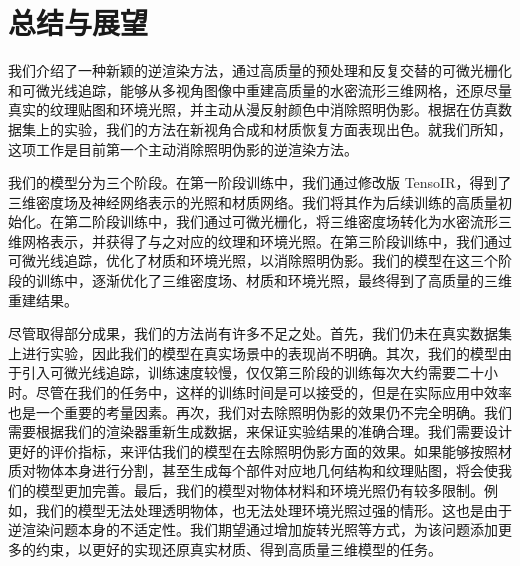 \chapter{总结与展望}

我们介绍了一种新颖的逆渲染方法，通过高质量的预处理和反复交替的可微光栅化和可微光线追踪，能够从多视角图像中重建高质量的水密流形三维网格，还原尽量真实的纹理贴图和环境光照，并主动从漫反射颜色中消除照明伪影。根据在仿真数据集上的实验，我们的方法在新视角合成和材质恢复方面表现出色。就我们所知，这项工作是目前第一个主动消除照明伪影的逆渲染方法。

我们的模型分为三个阶段。在第一阶段训练中，我们通过修改版 TensoIR，得到了三维密度场及神经网络表示的光照和材质网络。我们将其作为后续训练的高质量初始化。在第二阶段训练中，我们通过可微光栅化，将三维密度场转化为水密流形三维网格表示，并获得了与之对应的纹理和环境光照。在第三阶段训练中，我们通过可微光线追踪，优化了材质和环境光照，以消除照明伪影。我们的模型在这三个阶段的训练中，逐渐优化了三维密度场、材质和环境光照，最终得到了高质量的三维重建结果。

尽管取得部分成果，我们的方法尚有许多不足之处。首先，我们仍未在真实数据集上进行实验，因此我们的模型在真实场景中的表现尚不明确。其次，我们的模型由于引入可微光线追踪，训练速度较慢，仅仅第三阶段的训练每次大约需要二十小时。尽管在我们的任务中，这样的训练时间是可以接受的，但是在实际应用中效率也是一个重要的考量因素。再次，我们对去除照明伪影的效果仍不完全明确。我们需要根据我们的渲染器重新生成数据，来保证实验结果的准确合理。我们需要设计更好的评价指标，来评估我们的模型在去除照明伪影方面的效果。如果能够按照材质对物体本身进行分割，甚至生成每个部件对应地几何结构和纹理贴图，将会使我们的模型更加完善。最后，我们的模型对物体材料和环境光照仍有较多限制。例如，我们的模型无法处理透明物体，也无法处理环境光照过强的情形。这也是由于逆渲染问题本身的不适定性。我们期望通过增加旋转光照等方式，为该问题添加更多的约束，以更好的实现还原真实材质、得到高质量三维模型的任务。

